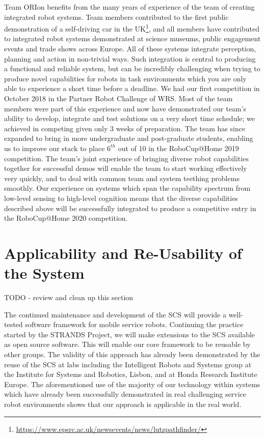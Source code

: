 \documentclass[runningheads,a4paper]{llncs}
\newcommand{\teamori}{Team ORIon}
\begin{document}
\teamori{} benefits from the many years of experience of the team of creating integrated robot systems. Team members contributed to the first public demonstration of a self-driving car in the UK\footnote{\url{https://www.epsrc.ac.uk/newsevents/news/lutzpathfinder/}}, and all members have contributed to integrated robot systems demonstrated at science museums, public engagement events and trade shows across Europe. All of these systems integrate perception, planning and action in non-trivial ways. Such integration is central to producing a functional and reliable system, but can be incredibly challenging when trying to produce novel capabilities for robots in task environments which you are only able to experience a short time before a deadline. We had our
first competition in October 2018 in the Partner Robot Challenge of WRS. 
Most of the team members were part of this experience and now have demonstrated
our team's ability to develop, integrate and test solutions on a very short
time schedule; we achieved in competing given only 3 weeks of preparation. The team has since expanded to bring in more undergraduate and post-graduate students, enabling us to improve our stack to place $6^{th}$ out of 10 in the RoboCup@Home 2019 competition.
The team's joint experience of bringing diverse robot capabilities together for successful demos will enable the team to start working effectively very quickly, and to deal with common team and system teething problems smoothly. Our experience on systems which span the capability spectrum from low-level sensing to high-level cognition means that the diverse capabilities described above will be successfully integrated to produce a competitive entry in the RoboCup@Home 2020 competition.

\section{Applicability and Re-Usability of the System}

TODO - review and clean up this section

The continued maintenance and development of the SCS will provide a well-tested software framework for mobile service robots. Continuing the practice started by the STRANDS Project, we will make extensions to the SCS available as open source software. This will enable our core framework to be reusable by other groups. The validity of this approach has already been demonstrated by the reuse of the SCS at labs including the Intelligent Robots and Systems group at the Institute for Systems and Robotics, Lisbon, and at Honda Research Institute Europe. The aforementioned use of the majority of our technology within systems which have already been successfully demonstrated in real challenging service robot environments shows that our approach is applicable in the real world.
\end{document}
